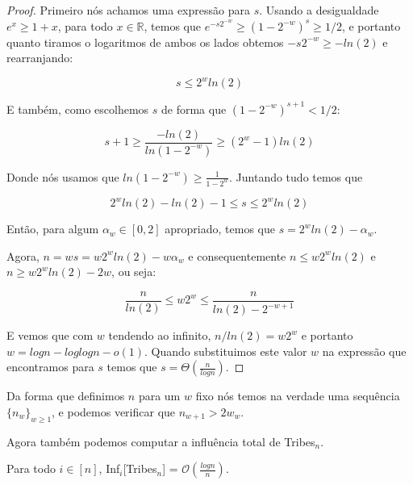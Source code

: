 \begin{proof}

    Primeiro nós achamos uma expressão para $s$. Usando a desigualdade $e^{x} \geq 1 + x$, para todo $x \in \mathbb{R}$, temos que $e^{-s2^{-w}} \geq (1 - 2^{-w})^{s} \geq 1/2$, e portanto quanto tiramos o logaritmos de ambos os lados obtemos $-s2^{-w} \geq -ln(2)$ e rearranjando:

    \begin{equation*}
        s \leq 2^{w}ln(2)
    \end{equation*}

    E também, como escolhemos $s$ de forma que $(1 - 2^{-w})^{s + 1} < 1/2$:

    \begin{equation*}
        s + 1 \geq \frac{-ln(2)}{ln(1 - 2^{-w})} \geq (2^{w} - 1)ln(2)
    \end{equation*}

    Donde nós usamos que $ln(1 - 2^{-w}) \geq \frac{1}{1 - 2^{w}}$. Juntando tudo temos que 

    \begin{equation*}
       2^{w}ln(2) - ln(2) - 1 \leq s \leq 2^{w}ln(2)
    \end{equation*} 

    Então, para algum $\alpha_{w} \in [0, 2]$ apropriado, temos que $s = 2^{w}ln(2) - \alpha_{w}$. 

    Agora, $n = ws = w2^{w}ln(2) - w\alpha_{w}$ e consequentemente $n \leq w2^{w}ln(2)$ e $n \geq w2^{w}ln(2) - 2w$, ou seja:

    \begin{equation*}
        \frac{n}{ln(2)} \leq w2^{w} \leq \frac{n}{ln(2) - 2^{-w + 1}}
    \end{equation*}

    E vemos que com $w$ tendendo ao infinito, $n/ln(2) = w2^{w}$ e portanto $w = logn - loglogn - o(1)$. Quando substituimos este valor $w$ na expressão que encontramos para $s$ temos que $s = \Theta(\frac{n}{logn})$.

\end{proof}

Da forma que definimos $n$ para um $w$ fixo nós temos na verdade uma sequência $\{n_{w}\}_{w \geq 1}$, e podemos verificar que $n_{w + 1} > 2w_{w}$.

Agora também podemos computar a influência total de Tribes$_{n}$.

\begin{prop}

    Para todo $i \in [n]$, Inf$_{i}$[Tribes$_{n}$] = $\mathcal{O}(\frac{logn}{n})$.

\end{prop}

